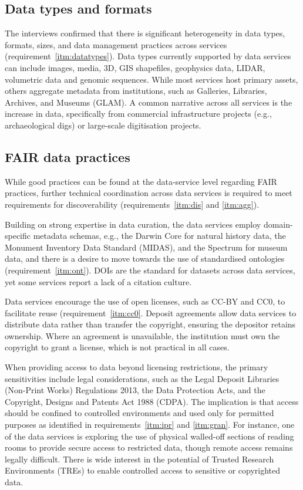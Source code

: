 \documentclass[11pt]{scrartcl}
\begin{document}
\subsection{Data types and formats}
The interviews confirmed that there is significant heterogeneity in data types, formats, sizes, and data management practices across services (requirement~\ref{itm:datatypes}).  
Data types currently supported by data services can include images, media, 3D, GIS shapefiles, geophysics data, LIDAR, volumetric data and genomic sequences. While most services host primary assets, others aggregate metadata from institutions, such as Galleries, Libraries, Archives, and Museums (GLAM). A common narrative across all services is the increase in data, specifically from commercial infrastructure projects (e.g., archaeological digs) or large-scale digitisation projects. 

\subsection{FAIR data practices}
While good practices can be found at the data-service level regarding FAIR practices, further technical coordination across data services is required to meet requirements for discoverability (requirements~\ref{itm:dis} and \ref{itm:agg}).

Building on strong expertise in data curation, the data services employ domain-specific metadata schemas, e.g., the Darwin Core for natural history data, the Monument Inventory Data Standard (MIDAS), and the Spectrum for museum data, and there is a desire to move towards the use of standardised ontologies (requirement~\ref{itm:ont}). DOIs are the standard for datasets across data services, yet some services report a lack of a citation culture.  

Data services encourage the use of open licenses, such as CC-BY and CC0, to facilitate reuse (requirement~\ref{itm:cc0}. Deposit agreements allow data services to distribute data rather than transfer the copyright, ensuring the depositor  retains  ownership. Where an agreement is unavailable, the institution must own the copyright to grant a license, which is not practical in all cases.

When providing access to data beyond licensing restrictions, the primary sensitivities include legal considerations, such as the Legal Deposit Libraries (Non-Print Works) Regulations 2013, the Data Protection Acts, and the Copyright, Designs and Patents Act 1988 (CDPA). The implication is that access should be confined to controlled environments and used only for permitted purposes as identified in requirements~\ref{itm:ipr} and \ref{itm:gran}. For instance, one of the data services is exploring the use of physical walled-off sections of reading rooms to provide secure access to restricted data, though remote access remains legally difficult. There is wide interest in the potential of Trusted Research Environments (TREs) to enable controlled access to sensitive or copyrighted data. 
  
\end{document}
